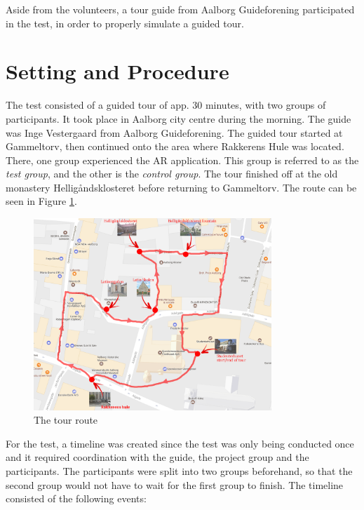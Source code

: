 Aside from the volunteers, a tour guide from Aalborg Guideforening participated in the test, in order to properly simulate a guided tour.

\section{Setting and Procedure}
The test consisted of a guided tour of app. 30 minutes, with two groups of participants. It took place in Aalborg city centre during the morning. The guide was Inge Vestergaard from Aalborg Guideforening. The guided tour started at Gammeltorv, then continued onto the area where Rakkerens Hule was located. There, one group experienced the AR application. This group is referred to as the \textit{test group}, and the other is the \textit{control group}. The tour finished off at the old monastery Helligåndsklosteret before returning to Gammeltorv. The route can be seen in Figure \ref{fig:map}.

\begin{figure}[h!]
   \centering
   \includegraphics[width=0.8\textwidth]{figures/Tour_map.png}
   \caption{The tour route}\label{fig:map}
\end{figure}

For the test, a timeline was created since the test was only being conducted once and it required coordination with the guide, the project group and the participants. The participants were split into two groups beforehand, so that the second group would not have to wait for the first group to finish. The timeline consisted of the following events:

